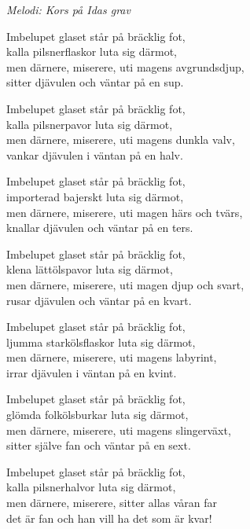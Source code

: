 {\footnotesize\textit{Melodi: Kors på Idas grav}}\par
\vspace{10pt}
Imbelupet glaset står på bräcklig fot,\\
kalla pilsnerflaskor luta sig därmot,\\
men därnere, miserere, uti magens avgrundsdjup,\\
sitter djävulen och väntar på en sup.\par
\vspace{10pt}
Imbelupet glaset står på bräcklig fot,\\
kalla pilsnerpavor luta sig därmot,\\
men därnere, miserere, uti magens dunkla valv,\\
vankar djävulen i väntan på en halv.\par
\vspace{10pt}
Imbelupet glaset står på bräcklig fot,\\
importerad bajerskt luta sig därmot,\\
men därnere, miserere, uti magen härs och tvärs,\\
knallar djävulen och väntar på en ters.\par
\vspace{10pt}
Imbelupet glaset står på bräcklig fot,\\
klena lättölspavor luta sig därmot,\\
men därnere, miserere, uti magen djup och svart,\\
rusar djävulen och väntar på en kvart.\par
\vspace{10pt}
Imbelupet glaset står på bräcklig fot,\\
ljumma starkölsflaskor luta sig därmot,\\
men därnere, miserere, uti magens labyrint,\\
irrar djävulen i väntan på en kvint.\par
\newpage
Imbelupet glaset står på bräcklig fot,\\
glömda folkölsburkar luta sig därmot,\\
men därnere, miserere, uti magens slingerväxt,\\
sitter själve fan och väntar på en sext.\par
\vspace{10pt}
Imbelupet glaset står på bräcklig fot,\\
kalla pilsnerhalvor luta sig därmot,\\
men därnere, miserere, sitter allas våran far\\
det är fan och han vill ha det som är kvar!
